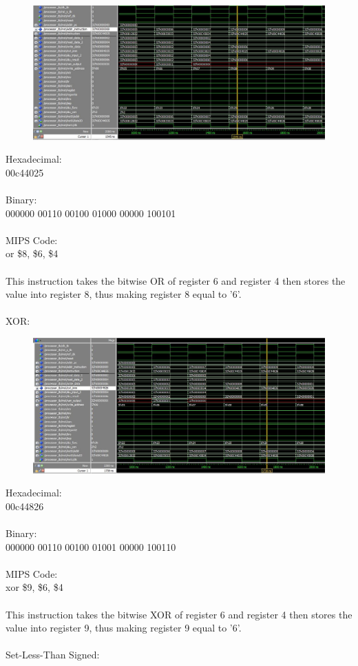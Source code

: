\documentclass[paper=letter, fontsize=11pt]{scrartcl} %
\numberwithin{equation}{section}
\numberwithin{figure}{section}
\numberwithin{table}{section}
\begin{document}
\begin{figure}[H]
	\centering
		\includegraphics[width=150mm]{../sim/photo/or.JPG}
	\label{fig:OR}
\end{figure}

Hexadecimal:
\\
00c44025
\\
\\
Binary:
\\
000000 00110 00100 01000 00000 100101
\\
\\
MIPS Code:
\\
or  \$8, \$6, \$4
\\
\\
This instruction takes the bitwise OR of register 6 and register 4 then stores the value into register 8, thus making register 8 equal to '6'.
\\
\pagebreak
\\
XOR:

\begin{figure}[H]
	\centering
		\includegraphics[width=150mm]{../sim/photo/xor.JPG}
	\label{fig:XOR}
\end{figure}

Hexadecimal:
\\
00c44826
\\
\\
Binary:
\\
000000 00110 00100 01001 00000 100110
\\
\\
MIPS Code:
\\
xor \$9, \$6, \$4
\\
\\
This instruction takes the bitwise XOR of register 6 and register 4 then stores the value into register 9, thus making register 9 equal to '6'.
\\
\pagebreak
\\
Set-Less-Than Signed: 
\end{document}
